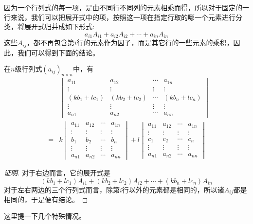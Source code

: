 因为一个行列式的每一项，是由不同行不同列的元素相乘而得，所以对于固定的一行来说，我们可以把展开式中的项，按照这一项在指定行取的哪一个元素进行分类，将展开式归并成如下形式:
\[ a_{i1}A_{i1}+a_{i2}A_{i2}+\cdots+a_{in}A_{in} \]
这些$A_{ij}$，都不再包含第$i$行的元素作为因子，而是其它行的一些元素的乘积，因此，我们可以得到下面的结论。
\begin{property}
  在$n$级行列式$(a_{ij})_{n \times n}$中，有
  \begin{eqnarray*}
    & & 
  \begin{vmatrix}
    a_{11} & a_{12} & \cdots & a_{1n} \\
    \vdots & \vdots & \vdots & \vdots \\
    (kb_1+lc_1) & (kb_2+lc_2) & \cdots & (kb_n+lc_n) \\
    \vdots & \vdots & \vdots & \vdots \\
    a_{n1} & a_{n2} & \cdots & a_{nn}
  \end{vmatrix}
  \\
   & = &  
  k
  \begin{vmatrix}
    a_{11} & a_{12} & \cdots & a_{1n} \\
    \vdots & \vdots & \vdots & \vdots \\
    b_1 & b_2 & \cdots & b_n \\
    \vdots & \vdots & \vdots & \vdots \\
    a_{n1} & a_{n2} & \cdots & a_{nn}
  \end{vmatrix}
  +
  l
  \begin{vmatrix}
    a_{11} & a_{12} & \cdots & a_{1n} \\
    \vdots & \vdots & \vdots & \vdots \\
    c_1 & c_2 & \cdots & c_n \\
    \vdots & \vdots & \vdots & \vdots \\
    a_{n1} & a_{n2} & \cdots & a_{nn}
  \end{vmatrix}
  \end{eqnarray*}
\end{property}

\begin{proof}[证明]
  对于右边而言，它的展开式是
  \[ (kb_1+lc_1)A_{i1}+(kb_2+lc_2)A_{i2}+\cdots+(kb_n+lc_n)A_{in} \]
  对于左右两边的三个行列式而言，除第$i$行以外的元素都是相同的，所以诸$A_{ij}$都是相同的，于是便有结论。
\end{proof}

这里提一下几个特殊情况。

